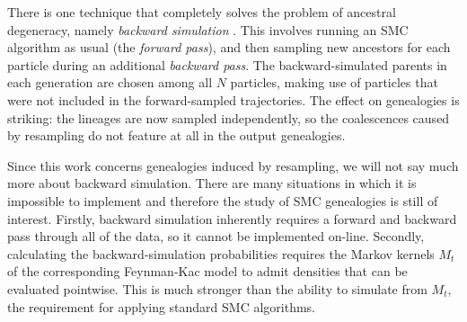 There is one technique that completely solves the problem of ancestral degeneracy, namely \emph{backward simulation} \parencite{godsill2004}. This involves running an SMC algorithm as usual (the \emph{forward pass}), and then sampling new ancestors for each particle during an additional \emph{backward pass}. 
The backward-simulated parents in each generation are chosen among all $N$ particles, making use of particles that were not included in the forward-sampled trajectories.
The effect on genealogies is striking: the lineages are now sampled independently, so the coalescences caused by resampling do not feature at all in the output genealogies.

Since this work concerns genealogies induced by resampling, we will not say much more about backward simulation. There are many situations in which it is impossible to implement and therefore the study of SMC genealogies is still of interest. 
Firstly, backward simulation inherently requires a forward and backward pass through all of the data, so it cannot be implemented on-line. 
Secondly, calculating the backward-simulation probabilities requires the Markov kernels $M_t$ of the corresponding Feynman-Kac model to admit densities that can be evaluated pointwise. This is much stronger than the ability to simulate from $M_t$, the requirement for applying standard SMC algorithms.




